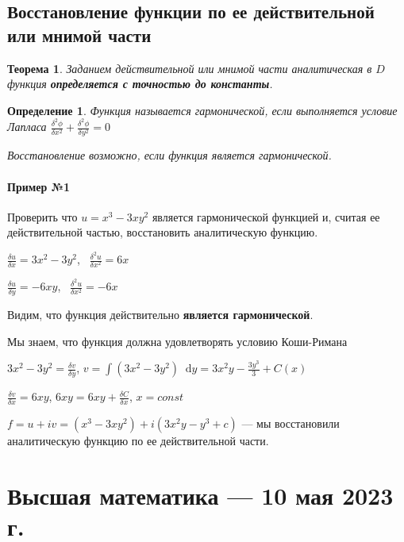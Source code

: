 \documentclass{article}
\newcommand*\diff{\mathop{}\!\mathrm{d}}
\newtheorem{definition}{Определение}
\newtheorem{theorem}{Теорема}
\begin{document}
\subsection{Восстановление функции по ее действительной или мнимой части}

\begin{theorem}
Заданием действительной или мнимой части аналитическая в $D$ функция \textbf{определяется с точностью до константы}.
\end{theorem}

\begin{definition}
Функция называется гармонической, если выполняется условие Лапласа $\frac{\delta^2 \phi}{\delta x^2} + \frac{\delta^2 \phi}{\delta y^2} = 0$

Восстановление возможно, если функция является гармонической.
\end{definition}

\paragraph{Пример №1}

Проверить что $u = x^3 - 3 x y^2$ является гармонической функцией и, считая ее действительной частью, восстановить аналитическую функцию.

\hfill

$\frac{\delta u}{\delta x} = 3 x^2 - 3 y^2$, \ $\frac{\delta^2 u}{\delta x^2} = 6 x$

$\frac{\delta u}{\delta y} = - 6 x y$, \ $\frac{\delta^2 u}{\delta x^2} = -6 x$

Видим, что функция действительно \textbf{является гармонической}.

\hfill

Мы знаем, что функция должна удовлетворять условию Коши-Римана

$3 x^2 - 3 y^2 = \frac{\delta v}{\delta y}$, $v = \int (3 x^2 - 3 y^2) \diff y = 3 x^2 y - \frac{3 y^3}{3} + C (x)$

$\frac{\delta v}{\delta x} = 6 x y$, $6 x y = 6 x y + \frac{\delta C}{\delta x}$, $x = const$

\hfill

$f = u + i v = (x^3 - 3 x y^2) + i (3x^2 y - y^3 + c)$ — мы восстановили аналитическую функцию по ее действительной части.

\pagebreak
\section{Высшая математика — 10 мая 2023 г.}
\end{document}
